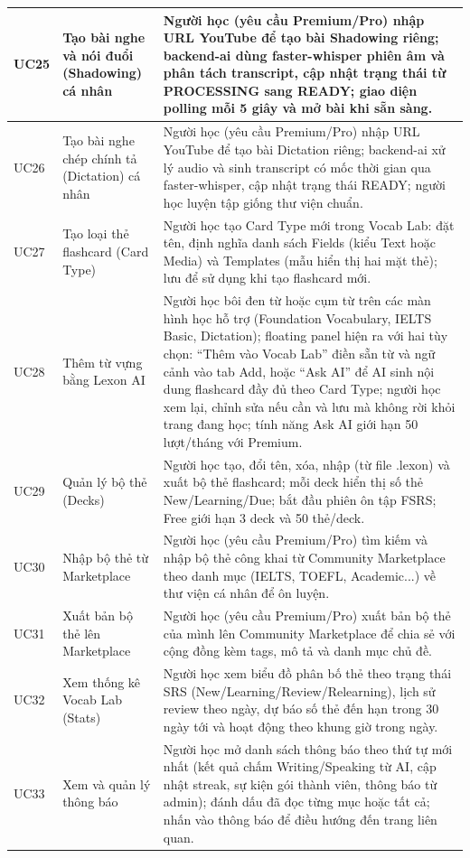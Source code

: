\begin{longtable}{|p{15\tbu}|p{45\tbu}|p{90\tbu}|}
    UC25 & Tạo bài nghe và nói đuổi (Shadowing) cá nhân & Người học (yêu cầu Premium/Pro) nhập URL YouTube để tạo bài Shadowing riêng; backend-ai dùng faster-whisper phiên âm và phân tách transcript, cập nhật trạng thái từ PROCESSING sang READY; giao diện polling mỗi 5 giây và mở bài khi sẵn sàng. \\ \hline
    UC26 & Tạo bài nghe chép chính tả (Dictation) cá nhân & Người học (yêu cầu Premium/Pro) nhập URL YouTube để tạo bài Dictation riêng; backend-ai xử lý audio và sinh transcript có mốc thời gian qua faster-whisper, cập nhật trạng thái READY; người học luyện tập giống thư viện chuẩn. \\ \hline
    UC27 & Tạo loại thẻ flashcard (Card Type) & Người học tạo Card Type mới trong Vocab Lab: đặt tên, định nghĩa danh sách Fields (kiểu Text hoặc Media) và Templates (mẫu hiển thị hai mặt thẻ); lưu để sử dụng khi tạo flashcard mới. \\ \hline
    UC28 & Thêm từ vựng bằng Lexon AI & Người học bôi đen từ hoặc cụm từ trên các màn hình học hỗ trợ (Foundation Vocabulary, IELTS Basic, Dictation); floating panel hiện ra với hai tùy chọn: ``Thêm vào Vocab Lab'' điền sẵn từ và ngữ cảnh vào tab Add, hoặc ``Ask AI'' để AI sinh nội dung flashcard đầy đủ theo Card Type; người học xem lại, chỉnh sửa nếu cần và lưu mà không rời khỏi trang đang học; tính năng Ask AI giới hạn 50 lượt/tháng với Premium. \\ \hline
    UC29 & Quản lý bộ thẻ (Decks) & Người học tạo, đổi tên, xóa, nhập (từ file .lexon) và xuất bộ thẻ flashcard; mỗi deck hiển thị số thẻ New/Learning/Due; bắt đầu phiên ôn tập FSRS; Free giới hạn 3 deck và 50 thẻ/deck. \\ \hline
    UC30 & Nhập bộ thẻ từ Marketplace & Người học (yêu cầu Premium/Pro) tìm kiếm và nhập bộ thẻ công khai từ Community Marketplace theo danh mục (IELTS, TOEFL, Academic...) về thư viện cá nhân để ôn luyện. \\ \hline
    UC31 & Xuất bản bộ thẻ lên Marketplace & Người học (yêu cầu Premium/Pro) xuất bản bộ thẻ của mình lên Community Marketplace để chia sẻ với cộng đồng kèm tags, mô tả và danh mục chủ đề. \\ \hline
    UC32 & Xem thống kê Vocab Lab (Stats) & Người học xem biểu đồ phân bố thẻ theo trạng thái SRS (New/Learning/Review/Relearning), lịch sử review theo ngày, dự báo số thẻ đến hạn trong 30 ngày tới và hoạt động theo khung giờ trong ngày. \\ \hline
    UC33 & Xem và quản lý thông báo & Người học mở danh sách thông báo theo thứ tự mới nhất (kết quả chấm Writing/Speaking từ AI, cập nhật streak, sự kiện gói thành viên, thông báo từ admin); đánh dấu đã đọc từng mục hoặc tất cả; nhấn vào thông báo để điều hướng đến trang liên quan. \\ \hline

\end{longtable}
